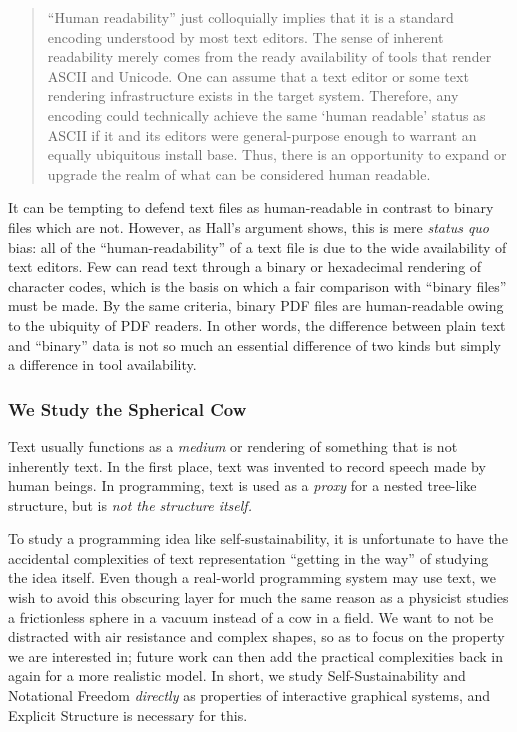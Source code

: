 \documentclass[ twoside,openright,titlepage,numbers=noenddot,headinclude,footinclude,cleardoublepage=empty,abstract=on,
                BCOR=5mm,paper=a4,fontsize=11pt
                ]{scrreprt}
\theoremstyle{definition}
\begin{document}
\begin{quote}
``Human readability'' just colloquially implies that it is a standard
encoding understood by most text editors. The sense of inherent
readability merely comes from the ready availability of tools that
render ASCII and Unicode. One can assume that a text editor or some text
rendering infrastructure exists in the target system. Therefore, any
encoding could technically achieve the same `human readable' status as
ASCII if it and its editors were general-purpose enough to warrant an
equally ubiquitous install base. Thus, there is an opportunity to expand
or upgrade the realm of what can be considered human readable.
\end{quote}

It can be tempting to defend text files as human-readable in contrast to
binary files which are not. However, as Hall's argument shows, this is
mere \emph{status quo} bias: all of the ``human-readability'' of a text
file is due to the wide availability of text editors. Few can read text
through a binary or hexadecimal rendering of character codes, which is
the basis on which a fair comparison with ``binary files'' must be made.
By the same criteria, binary PDF files are human-readable owing to the
ubiquity of PDF readers. In other words, the difference between plain
text and ``binary'' data is not so much an essential difference of two
kinds but simply a difference in tool availability.

\hypertarget{we-study-the-spherical-cow}{\subsubsection{We Study the Spherical
Cow}\label{we-study-the-spherical-cow}}

Text usually functions as a \emph{medium} or rendering of something that
is not inherently text. In the first place, text was invented to record
speech made by human beings. In programming, text is used as a
\emph{proxy} for a nested tree-like structure, but is \emph{not the
structure itself.}

To study a programming idea like self-sustainability, it is unfortunate
to have the accidental complexities of text representation ``getting in
the way'' of studying the idea itself. Even though a real-world
programming system may use text, we wish to avoid this obscuring layer
for much the same reason as a physicist studies a frictionless sphere in
a vacuum instead of a cow in a field. We want to not be distracted with
air resistance and complex shapes, so as to focus on the property we are
interested in; future work can then add the practical complexities back
in again for a more realistic model. In short, we study
Self-Sustainability and Notational Freedom \emph{directly} as properties
of interactive graphical systems, and Explicit Structure is necessary
for this.
\end{document}
